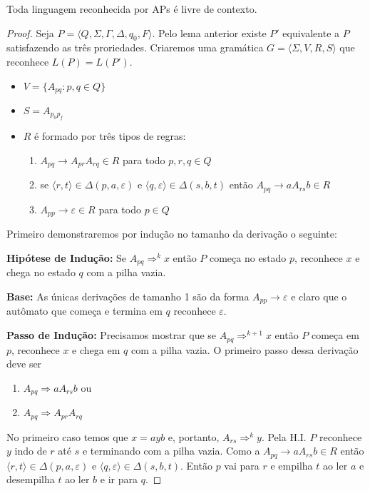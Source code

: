 \begin{theorem}
  Toda linguagem reconhecida por APs é livre de contexto.
\end{theorem}
\begin{proof}
  Seja $P = \langle Q, \Sigma, \Gamma, \Delta, q_0, F \rangle$.
  Pelo lema anterior existe $P'$ equivalente a $P$ satisfazendo as três proriedades.
Criaremos uma gramática $G = \langle \Sigma, V, R, S \rangle$ que reconhece $L(P) = L(P')$.

\begin{itemize}
\item $V = \{A_{pq} : p, q \in Q\}$
\item $S = A_{p_0p_f}$
\item $R$ é formado por três tipos de regras:
\begin{enumerate}
\item $A_{pq} \to A_{pr} A_{rq} \in R$ para todo $p,r,q \in Q$
\item se $\langle r, t \rangle \in \Delta(p, a, \varepsilon)$ e $\langle q, \varepsilon \rangle \in \Delta(s, b, t)$ então $A_{pq} \to a A_{rs} b \in R$
\item $A_{pp} \to \varepsilon \in R$ para todo $p \in Q$
\end{enumerate}
\end{itemize}

Primeiro demonstraremos por indução no tamanho da derivação o seguinte:

{\bf Hipótese de Indução:} Se $A_{pq} \Rightarrow^k x$ então $P$ começa no estado $p$, reconhece $x$ e chega no estado $q$ com a pilha vazia.

{\bf Base:} As únicas derivações de tamanho 1 são da forma $A_{pp} \to \varepsilon$ e claro que o autômato que começa e termina em $q$ reconhece $\varepsilon$.

{\bf Passo de Indução:} Precisamos mostrar que se $A_{pq} \Rightarrow^{k+1} x$ então $P$ começa em $p$, reconhece $x$ e chega em $q$ com a pilha vazia.
O primeiro passo dessa derivação deve ser
\begin{enumerate}
\item $A_{pq} \Rightarrow a A_{rs} b$ ou
\item $A_{pq} \Rightarrow A_{pr} A_{rq}$
\end{enumerate}

No primeiro caso temos que $x = ayb$ e, portanto, $A_{rs} \Rightarrow^k y$.
Pela H.I. $P$ reconhece $y$ indo de $r$ até $s$ e terminando com a pilha vazia.
Como a $A_{pq} \to a A_{rs} b \in R$ então $\langle r, t \rangle \in \Delta(p, a, \varepsilon)$ e $\langle q, \varepsilon \rangle \in \Delta(s, b, t)$.
Então $p$ vai para $r$ e empilha $t$ ao ler $a$ e desempilha $t$ ao ler $b$ e ir para $q$.


\end{proof}
